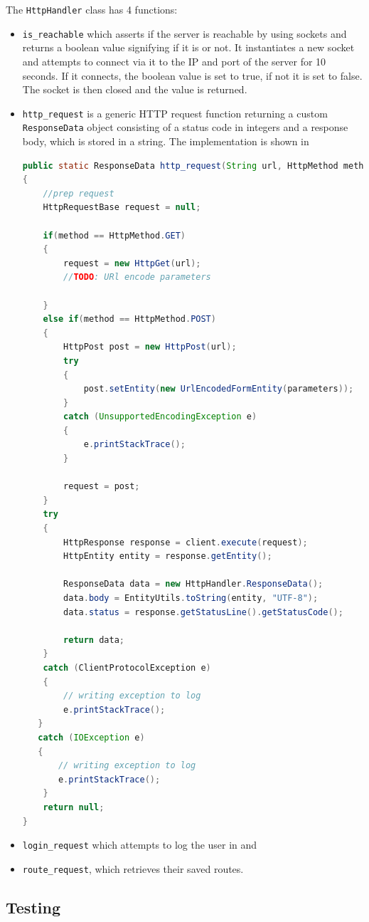 The \texttt{HttpHandler} class has 4 functions: 
\begin{itemize}
\item  \texttt{is\_reachable} which asserts if the server is reachable by using sockets and returns a boolean value signifying if it is or not. It instantiates a new socket and attempts to connect via it to the IP and port of the server for 10 seconds. If it connects, the boolean value is set to true, if not it is set to false. The socket is then closed and the value is returned.

\item \texttt{http\_request} is a generic \ac{HTTP} request function returning a custom \texttt{ResponseData} object consisting of a status code in integers and a response body, which is stored in a string. The implementation is shown in 

\begin{lstlisting}[label={lst:http-request},caption={The http-request function},language=java]    
public static ResponseData http_request(String url, HttpMethod method, List<NameValuePair> parameters)
{
    //prep request
    HttpRequestBase request = null;

    if(method == HttpMethod.GET)
    {
        request = new HttpGet(url);
        //TODO: URl encode parameters

    }
    else if(method == HttpMethod.POST)
    {
        HttpPost post = new HttpPost(url);
        try
        {
            post.setEntity(new UrlEncodedFormEntity(parameters));
        }
        catch (UnsupportedEncodingException e)
        {
            e.printStackTrace();
        }

        request = post;
    }
    try
    {
        HttpResponse response = client.execute(request);
        HttpEntity entity = response.getEntity();

        ResponseData data = new HttpHandler.ResponseData();
        data.body = EntityUtils.toString(entity, "UTF-8");
        data.status = response.getStatusLine().getStatusCode();

        return data;
    }
    catch (ClientProtocolException e)
    {
        // writing exception to log
        e.printStackTrace();
   }
   catch (IOException e)
   {
       // writing exception to log
       e.printStackTrace();
    }
    return null;
}
\end{lstlisting} 


\item \texttt{login\_request} which attempts to log the user in and
\item \texttt{route\_request}, which retrieves their saved routes.
\end{itemize}


\subsection{Testing}
